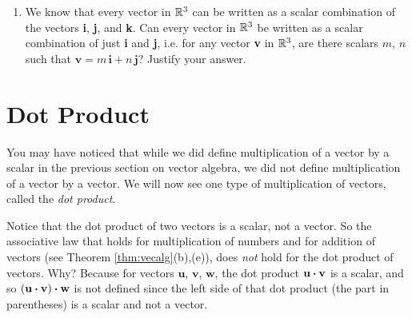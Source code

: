 \begin{enumerate}[\bfseries 1.]
[{[\bfseries 1.]}]
 \item We know that every vector in $\mathbb{R}^{3}$ can be written as a scalar combination of the vectors \textbf{i},
 \textbf{j}, and \textbf{k}. Can every vector in $\mathbb{R}^{3}$ be written as a scalar combination of just \textbf{i} and
 \textbf{j}, i.e. for any vector \textbf{v} in $\mathbb{R}^{3}$, are there scalars $m$, $n$ such that $\textbf{v} =
 m\,\textbf{i} + n\,\textbf{j}$? Justify your answer.
\end{enumerate}
\newpage
\section{Dot Product}
You may have noticed that while we did define multiplication of a vector by a scalar in the previous section on
vector algebra, we did not define multiplication of a vector by a vector. We will now see one type of
multiplication of vectors, called the \emph{dot product}.


Notice that the dot product of two vectors is a scalar, not a vector. 
So the associative law that holds for multiplication of numbers and for addition of vectors (see
Theorem \ref{thm:vecalg}(b),(e)), does \emph{not} hold for the dot product of vectors. Why? Because for vectors
$\textbf{u}$, $\textbf{v}$, $\textbf{w}$, the dot product $\textbf{u} \bm{\cdot} \textbf{v}$ is a scalar, and so
$(\textbf{u} \bm{\cdot} \textbf{v}) \bm{\cdot} \textbf{w}$ is not defined since the left side of that dot product
(the part in parentheses) is a scalar and not a vector.

